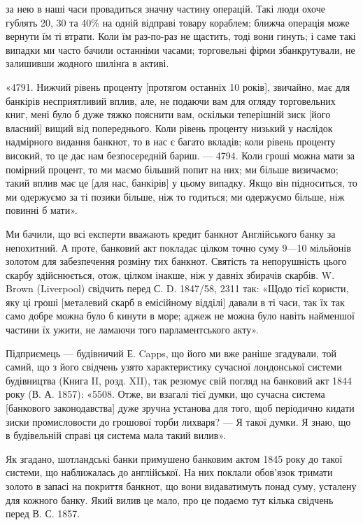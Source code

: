за нею в наші часи провадиться значну частину операцій. Такі люди охоче
гублять 20, 30 та 40\% на одній відправі товару кораблем; ближча операція
може вернути їм ті втрати. Коли їм раз-по-раз не щастить, тоді вони гинуть;
і саме такі випадки ми часто бачили останніми часами; торговельні фірми
збанкрутували, не залишивши жодного шилінґа в активі.

«4791. Нижчий рівень проценту [протягом останніх 10 років], звичайно,
має для банкірів несприятливий вплив, але, не подаючи вам для огляду торговельних
книг, мені було б дуже тяжко пояснити вам, оскільки теперішній
зиск [його власний] вищий від попереднього. Коли рівень проценту низький у
наслідок надмірного видання банкнот, то в нас є багато вкладів; коли рівень
проценту високий, то це дає нам безпосередній бариш. — 4794. Коли гроші можна
мати за помірний процент, то ми маємо більший попит на них; ми більше
визичаємо; такий вплив має це [для нас, банкірів] у цьому випадку. Якщо він
підноситься, то ми одержуємо за ті позики більше, ніж то годиться; ми одержуємо
більше, ніж повинні б мати».

Ми бачили, що всі експерти вважають кредит банкнот Англійського банку
за непохитний. А проте, банковий акт покладає цілком точно суму 9—10
мільйонів золотом для забезпечення розміну тих банкнот. Святість та непорушність
цього скарбу здійснюється, отож, цілком інакше, ніж у давніх збирачів
скарбів. W. Brown (Liverpool) свідчить перед С. D. 1847/58, 2311 так: «Щодо
тієї користи, яку ці гроші [металевий скарб в емісійному відділі] давали в ті
часи, так їх так само добре можна було б кинути в море; аджеж не можна було
навіть найменшої частини їх ужити, не ламаючи того парламентського акту».

Підприємець — будівничий Е. Capps, що його ми вже раніше згадували,
той самий, що з його свідчень узято характеристику сучасної лондонської системи
будівництва (Книга II, розд. XII), так резюмує свій погляд на банковий
акт 1844 року (В. А. 1857): «5508. Отже, ви взагалі тієї думки, що сучасна
система [банкового законодавства] дуже зручна установа для того, щоб періодично
кидати зиски промисловости до грошової торби лихваря? — Я такої думки.
Я знаю, що в будівельній справі ця система мала такий вилив».

Як згадано, шотландські банки примушено банковим актом 1845 року до
такої системи, що наближалась до англійської. На них поклали обов’язок тримати
золото в запасі на покриття банкнот, що вони видаватимуть понад суму,
усталену для кожного банку. Який вилив це мало, про це подаємо тут кілька
свідчень перед В. С. 1857.


